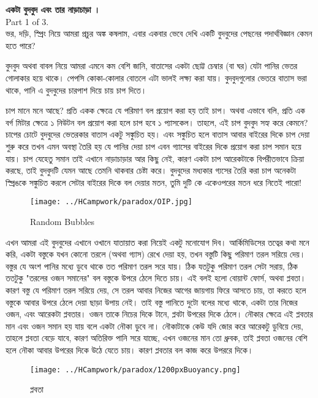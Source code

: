 \documentclass[11pt,a4paper]{article}
\begin{document}
\textbf{একটা বুদবুদ এবং তার নাড়াচাড়া । } \\ 
{\tiny Part 1 of 3.} \\
ভর, দড়ি, স্প্রিং নিয়ে আমরা প্রচুর অঙ্ক কষলাম, এবার একবার ভেবে দেখি একটি বুদবুদের পেছনের পদার্থবিজ্ঞান কেমন হতে পারে? 

বুদবুদ অথবা বাবল নিয়ে আমরা এমনে কম বেশি জানি, বাতাসের একটা ছোট্ট চেম্বার (বা ঘর) যেটা পানির ভেতর গোলাকার হয়ে থাকে। পেপসি কোকা-কোলার বোতলে এটা ভালই লক্ষ্য করা যায়। 
বুদবুদগুলোর ভেতরে বাতাস ভরা থাকে, পানি এ বুদবুদের চারপাশ দিয়ে চায় চাপ দিতে।

চাপ মানে মনে আছে? প্রতি একক ক্ষেত্রে যে পরিমাণ বল প্রয়োগ করা হয় তাই চাপ। অথবা এভাবে বলি, প্রতি এক বর্গ মিটার ক্ষেত্রে ১ নিউটন বল প্রয়োগ করা হলে চাপ হবে ১ প্যাসকেল। 
তাহলে, এই চাপ বুদবুদ সহ্য করে কেমনে? চাপের চোটে বুদবুদের ভেতরকার বাতাস একটু সঙ্কুচিত হয়। এবং সঙ্কুচিত হলে বাতাস আবার বাইরের দিকে চাপ দেয়া শুরু করে তখন এমন অবস্থা তৈরি হয় যে পানির দেয়া চাপ এবন গ্যাসের বাইরের দিকে প্রয়োগ করা চাপ সমান হয়ে যায়। চাপ যেহেতু সমান তাই এখানে নাড়াচাড়ার আর কিছু নেই, কারণ একটা চাপ আরেকটাকে বিপরীতভাবে ক্রিয়া করছে, তাই বুদবুদটি যেমন আছে তেমনি থাকবার চেষ্টা করে। বুদবুদের মধ্যকার গ্যসের তৈরি করা চাপ অনেকটা স্প্রিঙকে সঙ্কুচিত করলে সেটার বাইরের দিকে বল দেয়ার মতন, তুমি দুটি কে একেওপরের মতন ধরে নিতেই পারো! 

\begin{figure}[hbtp]
\centering
\texttt{[image: ../HCampwork/paradox/OIP.jpg]}
\caption{Random Bubbles }
\end{figure}
এখন আমরা এই বুদবুদের এখানে ওখানে যাতায়াত করা নিয়েই একটু মনোযোগ দিব। 
আর্কিমিডিসের তত্বের কথা মনে করি, একটা বস্তুকে যখন কোনো তরলে (অথবা গ্যাস) রেখে দেয়া হয়, তখন বস্তুটি কিছু পরিমাণ তরল সরিয়ে দেয়। বস্তুর যে অংশ পানির মধ্যে ডুবে থাকে তত পরিমাণ তরল সরে যায়। ঠিক যতটুকু পরিমাণ তরল সেটা সরায়, ঠিক ততটুকু "তরলের ওজন সমানের" বল বস্তুকে উপরে ঠেলে দিতে চায়। এই বলই হলো বোয়ান্ট ফোর্স, অথবা প্লবতা। কারণ বস্তু যে পরিমাণ তরল সরিয়ে দেয়, সে তরল আবার নিজের আগের জায়গায় ফিরে আসতে চায়, তা করতে হলে বস্তুকে আবার উপরে ঠেলে দেয়া ছাড়া উপায় নেই।  
তাই বস্তু পানিতে দুটো বলের মধ্যে থাকে, একটা তার নিজের ওজন, এবং আরেকটা প্লবতার। ওজন তাকে নিচের দিকে টানে, প্লবটা উপরের দিকে ঠেলে। নৌকার ক্ষেত্রে এই প্লবতার মান এবং ওজন সমান হয় যায় বলে একটা নৌকা ডুবে না। নৌকাটাকে কেউ যদি জোর করে আরেকটু ডুবিয়ে দেয়, তাহলে প্লবতা বেড়ে যাবে, কারণ অতিরিক্ত পানি সরে যাচ্ছে, এখন ওজনের মান তো ধ্রুবক, তাই প্লবতা ওজনের বেশি হলে নৌকা আবার উপরের দিকে উঠে যেতে চায়। কারণ প্লবতার বল কাজ করে উপররে দিকে। 
\begin{figure}[hbtp]
\centering
\texttt{[image: ../HCampwork/paradox/1200pxBuoyancy.png]}
\caption{প্লবতা }
\end{figure}
\end{document}
